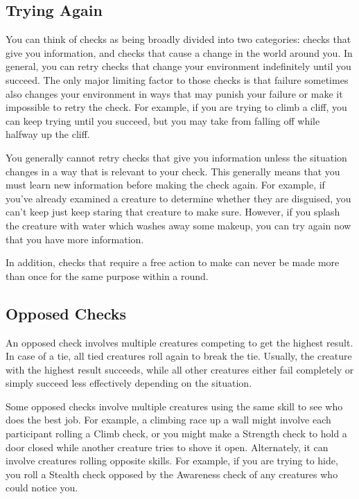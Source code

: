   \subsection{Trying Again}
    You can think of checks as being broadly divided into two categories: checks that give you information, and checks that cause a change in the world around you.
    In general, you can retry checks that change your environment indefinitely until you succeed.
    The only major limiting factor to those checks is that failure sometimes also changes your environment in ways that may punish your failure or make it impossible to retry the check.
    For example, if you are trying to climb a cliff, you can keep trying until you succeed, but you may take  from falling off while halfway up the cliff.

    You generally cannot retry checks that give you information unless the situation changes in a way that is relevant to your check.
    This generally means that you must learn new information before making the check again.
    For example, if you've already examined a creature to determine whether they are disguised, you can't keep just keep staring that creature to make sure.
    However, if you splash the creature with water which washes away some makeup, you can try again now that you have more information.

    In addition, checks that require a free action to make can never be made more than once for the same purpose within a round.

  \subsection{Opposed Checks}
    An opposed check involves multiple creatures competing to get the highest result.
    In case of a tie, all tied creatures roll again to break the tie.
    Usually, the creature with the highest result succeeds, while all other creatures either fail completely or simply succeed less effectively depending on the situation.

    Some opposed checks involve multiple creatures using the same skill to see who does the best job.
    For example, a climbing race up a wall might involve each participant rolling a Climb check, or you might make a Strength check to hold a door closed while another creature tries to shove it open.
    Alternately, it can involve creatures rolling opposite skills.
    For example, if you are trying to hide, you roll a Stealth check opposed by the Awareness check of any creatures who could notice you.

